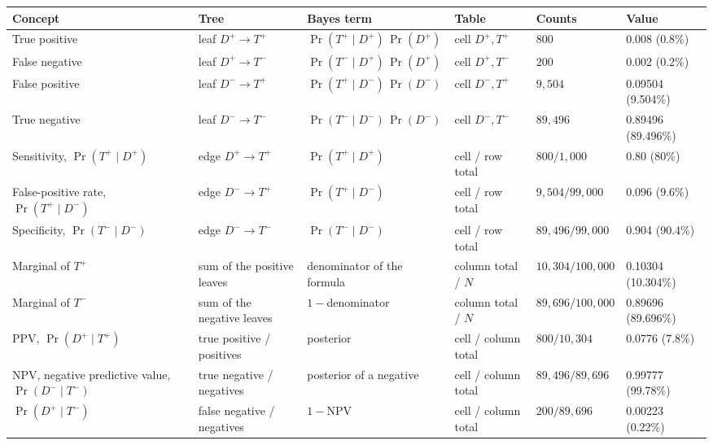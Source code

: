 \documentclass[11pt]{article}
\begin{document}
\begin{table}[tbp]
\centering
\footnotesize
\setlength{\tabcolsep}{3pt}
\renewcommand{\arraystretch}{1.25}
\begin{tabular}{P{0.12\textwidth}|P{0.15\textwidth}|P{0.215\textwidth}|P{0.125\textwidth}|P{0.16\textwidth}|P{0.11\textwidth}}
\toprule
\textbf{Concept} & \textbf{Tree} & \textbf{Bayes term} & \textbf{Table} & \textbf{Counts} & \textbf{Value} \\
\midrule
{} True positive   & leaf $D^+ \to T^+$ & $\Pr(T^+ \mid D^+)\,\Pr(D^+)$ & cell $D^+, T^+$ & $800$ & 0.008 (0.8\%) \\
 False negative  & leaf $D^+ \to T^-$ & $\Pr(T^- \mid D^+)\,\Pr(D^+)$ & cell $D^+, T^-$ & $200$ & 0.002 (0.2\%) \\
 False positive  & leaf $D^- \to T^+$ & $\Pr(T^+ \mid D^-)\,\Pr(D^-)$ & cell $D^-, T^+$ & $9{,}504$ & 0.09504 (9.504\%) \\
 True negative   & leaf $D^- \to T^-$ & $\Pr(T^- \mid D^-)\,\Pr(D^-)$ & cell $D^-, T^-$ & $89{,}496$ & 0.89496 (89.496\%) \\
\midrule
Sensitivity, $\Pr(T^+ \mid D^+)$ & edge $D^+ \to T^+$ & $\Pr(T^+ \mid D^+)$ & cell / row total & $800 / 1{,}000$ & 0.80 (80\%) \\
False-positive rate, $\Pr(T^+ \mid D^-)$ & edge $D^- \to T^+$ & $\Pr(T^+ \mid D^-)$ & cell / row total & $9{,}504 / 99{,}000$ & 0.096 (9.6\%) \\
Specificity, $\Pr(T^- \mid D^-)$ & edge $D^- \to T^-$ & $\Pr(T^- \mid D^-)$ & cell / row total & $89{,}496 / 99{,}000$ & 0.904 (90.4\%) \\
Marginal of $T^+$ & sum of the positive leaves & denominator of the formula & column total / $N$ & $10{,}304 / 100{,}000$ & 0.10304 (10.304\%) \\
Marginal of $T^-$ & sum of the negative leaves & $1 - {}$denominator & column total / $N$ & $89{,}696 / 100{,}000$ & 0.89696 (89.696\%) \\
PPV, $\Pr(D^+ \mid T^+)$ & true positive / positives & posterior & cell / column total & $800 / 10{,}304$ & 0.0776 (7.8\%) \\
NPV, negative predictive value, $\Pr(D^- \mid T^-)$ & true negative / negatives & posterior of a negative & cell / column total & $89{,}496 / 89{,}696$ & 0.99777 (99.78\%) \\
$\Pr(D^+ \mid T^-)$ & false negative / negatives & $1 - \mathrm{NPV}$ & cell / column total & $200 / 89{,}696$ & 0.00223 (0.22\%) \\

\end{tabular}
\end{table}
\end{document}
